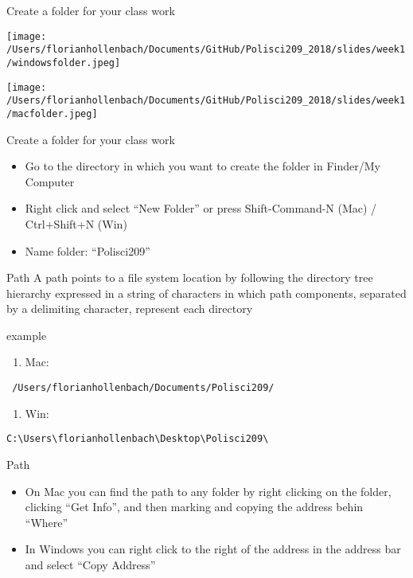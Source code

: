 \documentclass[presentation]{beamer}
\begin{document}
\begin{frame}[label={sec:orge098fb2}]{Create a folder for your class work}
\begin{center}
\texttt{[image: /Users/florianhollenbach/Documents/GitHub/Polisci209\_2018/slides/week1/windowsfolder.jpeg]}
\end{center}

\begin{center}
\texttt{[image: /Users/florianhollenbach/Documents/GitHub/Polisci209\_2018/slides/week1/macfolder.jpeg]}
\end{center}
\end{frame}

\begin{frame}[label={sec:org009eb83}]{Create a folder for your class work}
\begin{itemize}
\item Go to the directory in which you want to create the folder in Finder/My Computer
\item Right click and select ``New Folder'' or press Shift-Command-N (Mac) / Ctrl+Shift+N (Win)
\item Name folder: ``Polisci209''
\end{itemize}
\end{frame}

\begin{frame}[fragile,label={sec:orgdaee25c}]{Path}
 A path points to a file system location by following the directory tree hierarchy expressed in a string of characters in which path components, separated by a delimiting character, represent each directory

example
\begin{enumerate}
\item Mac:
\end{enumerate}
\begin{verbatim}
 /Users/florianhollenbach/Documents/Polisci209/
\end{verbatim}
\begin{enumerate}
\item Win:
\end{enumerate}
\begin{verbatim}
C:\Users\florianhollenbach\Desktop\Polisci209\
\end{verbatim}
\end{frame}


\begin{frame}[label={sec:orgdc6dfa7}]{Path}
\begin{itemize}
\item On Mac you can find the path to any folder by right clicking on the folder, clicking ``Get Info'', and then marking and copying the address behin ``Where''

\item In Windows you can right click to the right of the address in the address bar and select ``Copy Address''
\end{itemize}
\end{frame}
\end{document}
